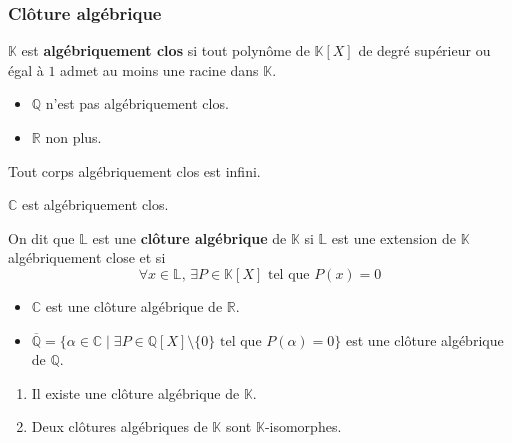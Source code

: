   \subsubsection{Clôture algébrique}

  \begin{definition}
    $\mathbb{K}$ est \textbf{algébriquement clos} si tout polynôme de $\mathbb{K}[X]$ de degré supérieur ou égal à $1$ admet au moins une racine dans $\mathbb{K}$.
  \end{definition}

  \begin{example}
    \begin{itemize}
      \item $\mathbb{Q}$ n'est pas algébriquement clos.
      \item $\mathbb{R}$ non plus.
    \end{itemize}
  \end{example}

  \begin{proposition}
    Tout corps algébriquement clos est infini.
  \end{proposition}

  \begin{theorem}
    $\mathbb{C}$ est algébriquement clos.
  \end{theorem}

  \begin{definition}
    On dit que $\mathbb{L}$ est une \textbf{clôture algébrique} de $\mathbb{K}$ si $\mathbb{L}$ est une extension de $\mathbb{K}$ algébriquement close et si
    \[ \forall x \in \mathbb{L}, \, \exists P \in \mathbb{K}[X] \text{ tel que } P(x) = 0 \]
  \end{definition}

  \begin{example}
    \begin{itemize}
      \item $\mathbb{C}$ est une clôture algébrique de $\mathbb{R}$.
      \item $\overline{\mathbb{Q}} = \{ \alpha \in \mathbb{C} \mid \exists P \in \mathbb{Q}[X] \setminus \{ 0 \} \text{ tel que } P(\alpha) = 0 \}$ est une clôture algébrique de $\mathbb{Q}$.
    \end{itemize}
  \end{example}

  \begin{theorem}
    \begin{enumerate}[label={\bfseries(\roman*)}]
      \item Il existe une clôture algébrique de $\mathbb{K}$.
      \item Deux clôtures algébriques de $\mathbb{K}$ sont $\mathbb{K}$-isomorphes.
    \end{enumerate}
  \end{theorem}

